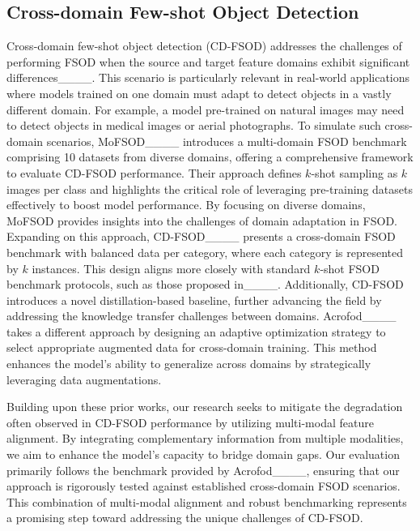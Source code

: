\subsection{Cross-domain Few-shot Object Detection}
Cross-domain few-shot object detection (CD-FSOD) addresses the challenges of performing FSOD when the source and target feature domains exhibit significant differences____. This scenario is particularly relevant in real-world applications where models trained on one domain must adapt to detect objects in a vastly different domain. For example, a model pre-trained on natural images may need to detect objects in medical images or aerial photographs.
To simulate such cross-domain scenarios, MoFSOD____ introduces a multi-domain FSOD benchmark comprising 10 datasets from diverse domains, offering a comprehensive framework to evaluate CD-FSOD performance. Their approach defines \( k \)-shot sampling as \( k \) images per class and highlights the critical role of leveraging pre-training datasets effectively to boost model performance. By focusing on diverse domains, MoFSOD provides insights into the challenges of domain adaptation in FSOD.
Expanding on this approach, CD-FSOD____ presents a cross-domain FSOD benchmark with balanced data per category, where each category is represented by \( k \) instances. This design aligns more closely with standard \( k \)-shot FSOD benchmark protocols, such as those proposed in____. Additionally, CD-FSOD introduces a novel distillation-based baseline, further advancing the field by addressing the knowledge transfer challenges between domains.
Acrofod____ takes a different approach by designing an adaptive optimization strategy to select appropriate augmented data for cross-domain training. This method enhances the model's ability to generalize across domains by strategically leveraging data augmentations.

Building upon these prior works, our research seeks to mitigate the degradation often observed in CD-FSOD performance by utilizing multi-modal feature alignment. By integrating complementary information from multiple modalities, we aim to enhance the model's capacity to bridge domain gaps. Our evaluation primarily follows the benchmark provided by Acrofod____, ensuring that our approach is rigorously tested against established cross-domain FSOD scenarios. This combination of multi-modal alignment and robust benchmarking represents a promising step toward addressing the unique challenges of CD-FSOD.